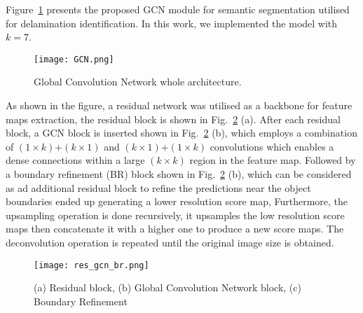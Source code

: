 Figure~\ref{fig:gcn} presents the proposed GCN module for semantic segmentation 
utilised for delamination identification.
In this work, we implemented the model with \(k=7\).
\begin{figure} [h!]
	\begin{center}
		\texttt{[image: GCN.png]}
	\end{center}
	\caption{Global Convolution Network whole architecture.} 
	\label{fig:gcn}
\end{figure}
As shown in the figure, a residual network was utilised as a backbone for 
feature maps extraction, the residual block is shown in 
Fig.~\ref{fig:res_gcn_br} (a).
After each residual block, a GCN block is inserted shown in 
Fig.~\ref{fig:res_gcn_br} (b), which employs a combination of \((1\times 
k)\)+\((k\times 1)\) and \((k\times 1)\)+\((1\times k)\) convolutions which 
enables a dense connections within a large \((k\times k)\) region in the 
feature map.
Followed by a boundary refinement (BR) block shown in Fig.~\ref{fig:res_gcn_br} 
(b), which can be considered as ad additional residual block to refine the 
predictions near the object boundaries ended up generating a lower 
resolution score map, 
Furthermore, the upsampling operation is done recursively, it upsamples the low 
resolution score maps then concatenate it with a higher one to produce a new 
score maps.
The deconvolution operation is repeated until the original image size is 
obtained.
\begin{figure} [h!]
	\begin{center}
		\texttt{[image: res\_gcn\_br.png]}
	\end{center}
	\caption{(a) Residual block, (b) Global Convolution Network block, (c) 
		Boundary Refinement} 
	\label{fig:res_gcn_br}
\end{figure}


